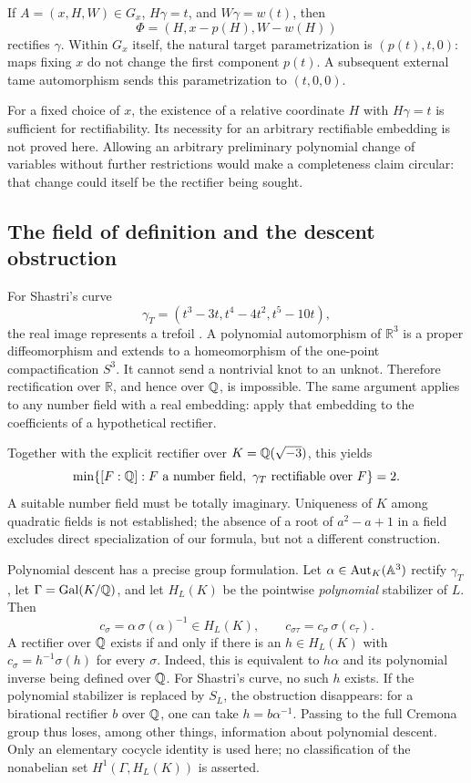 If $A=(x,H,W)\in G_x$, $H\gamma=t$, and $W\gamma=w(t)$, then
\begin{equation}\label{eq:relative-rectifier}
 \Phi=(H,x-p(H),W-w(H))
\end{equation}
rectifies $\gamma$. Within $G_x$ itself, the natural target
parametrization is $(p(t),t,0)$: maps fixing $x$ do not change
the first component $p(t)$. A subsequent external tame
automorphism sends this parametrization to $(t,0,0)$.

\begin{remark}\label{rem:relative-not-necessary}
For a fixed choice of $x$, the existence of a relative coordinate
$H$ with $H\gamma=t$ is sufficient for rectifiability.
Its necessity for an arbitrary rectifiable embedding is not
proved here. Allowing an arbitrary preliminary polynomial change
of variables without further restrictions would make a
completeness claim circular: that change could itself be the
rectifier being sought.
\end{remark}

\subsection{The field of definition and the descent obstruction}

For Shastri's curve
\[
 \gamma_T=(t^3-3t,t^4-4t^2,t^5-10t),
\]
the real image represents a trefoil
\cite[\S3, Example~1]{Shastri1992}.
A polynomial automorphism of $\mathbb R^3$ is a proper
diffeomorphism and extends to a homeomorphism of the one-point
compactification $S^3$. It cannot send a nontrivial knot to an
unknot. Therefore rectification over $\mathbb R$, and hence over
${\mathbb Q}$, is impossible. The same argument applies to any number
field with a real embedding: apply that embedding to the
coefficients of a hypothetical rectifier.

Together with the explicit rectifier over $K={\mathbb Q}(\sqrt{-3})$,
this yields
\[
 \min\{[F:{\mathbb Q}]: F\text{ a number field},\
 \gamma_T\text{ rectifiable over }F\}=2.
\]
A suitable number field must be totally imaginary.
Uniqueness of $K$ among quadratic fields is not established;
the absence of a root of $a^2-a+1$ in a field excludes direct
specialization of our formula, but not a different construction.

Polynomial descent has a precise group formulation. Let
$\alpha\in\operatorname{Aut}_K({\mathbb A}^3)$ rectify $\gamma_T$, let
$\Gamma=\operatorname{Gal}(K/{\mathbb Q})$, and let $H_L(K)$ be the
pointwise \emph{polynomial} stabilizer of $L$. Then
\[
 c_\sigma=\alpha\,\sigma(\alpha)^{-1}\in H_L(K),\qquad
 c_{\sigma\tau}=c_\sigma\,\sigma(c_\tau).
\]
A rectifier over ${\mathbb Q}$ exists if and only if there is an
$h\in H_L(K)$ with $c_\sigma=h^{-1}\sigma(h)$ for every $\sigma$.
Indeed, this is equivalent to $h\alpha$ and its polynomial
inverse being defined over ${\mathbb Q}$. For Shastri's curve, no such
$h$ exists. If the polynomial stabilizer is replaced by $S_L$,
the obstruction disappears: for a birational rectifier $b$
over ${\mathbb Q}$, one can take $h=b\alpha^{-1}$.
Passing to the full Cremona group thus loses, among other
things, information about polynomial descent.
Only an elementary cocycle identity is used here; no
classification of the nonabelian set $H^1(\Gamma,H_L(K))$
is asserted.

